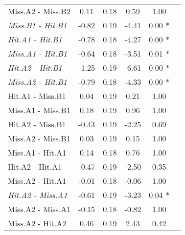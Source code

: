 \begin{landscape}
\begin{table}
\begin{multicols}{4}
\begin{tabular}{|l|*{5}{c|}}
Miss.A2 - Miss.B2 & 0.11 & 0.18 & 0.59 & 1.00 \\ 
\textit{Miss.B1 - Hit.B1} & -0.82 & 0.19 & -4.41 & 0.00 * \\ 
\textit{Hit.A1 - Hit.B1} & -0.78 & 0.18 & -4.27 & 0.00 * \\ 
\textit{Miss.A1 - Hit.B1} & -0.64 & 0.18 & -3.51 & 0.01 * \\ 
\textit{Hit.A2 - Hit.B1}& -1.25 & 0.19 & -6.61 & 0.00 * \\ 
\textit{Miss.A2 - Hit.B1} & -0.79 & 0.18 & -4.33 & 0.00 * \\ 
Hit.A1 - Miss.B1 & 0.04 & 0.19 & 0.21 & 1.00 \\ 
Miss.A1 - Miss.B1 & 0.18 & 0.19 & 0.96 & 1.00 \\ 
Hit.A2 - Miss.B1 & -0.43 & 0.19 & -2.25 & 0.69 \\ 
Miss.A2 - Miss.B1 & 0.03 & 0.19 & 0.15 & 1.00 \\ 
Miss.A1 - Hit.A1 & 0.14 & 0.18 & 0.76 & 1.00 \\ 
Hit.A2 - Hit.A1 & -0.47 & 0.19 & -2.50 & 0.35 \\ 
Miss.A2 - Hit.A1 & -0.01 & 0.18 & -0.06 & 1.00 \\ 
\textit{Hit.A2 - Miss.A1} & -0.61 & 0.19 & -3.23 & 0.04 * \\ 
Miss.A2 - Miss.A1 & -0.15 & 0.18 & -0.82 & 1.00 \\ 
Miss.A2 - Hit.A2 & 0.46 & 0.19 & 2.43 & 0.42 \\ 
\hline
\end{tabular}


\end{multicols}
\end{table}
\end{landscape}
